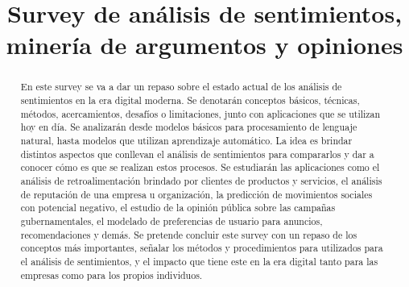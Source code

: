 \documentclass[conference]{IEEEtran}
\begin{document}
\title{Survey de análisis de sentimientos, minería de argumentos y opiniones\\
}

\author{
\and
{}
\and
{}
}

\maketitle

\begin{abstract}
  En este survey se va a dar un repaso sobre el estado actual de los análisis de sentimientos en la era digital moderna. 
  Se denotarán conceptos básicos, técnicas, métodos, acercamientos, desafíos o limitaciones, junto con aplicaciones que se utilizan hoy en día. 
  Se analizarán desde modelos básicos para procesamiento de lenguaje natural, hasta modelos que utilizan aprendizaje automático. 
  La idea es brindar distintos aspectos que conllevan el análisis de sentimientos para compararlos y dar a conocer cómo es que se realizan estos procesos. 
  Se estudiarán las aplicaciones como el análisis de retroalimentación brindado por clientes de productos y servicios, el análisis de reputación de una empresa u organización, la predicción de movimientos sociales con potencial negativo, el estudio de la opinión pública sobre las campañas gubernamentales, el modelado de preferencias de usuario para anuncios, recomendaciones y demás. 
  Se pretende concluir este survey con un repaso de los conceptos más importantes, señalar los métodos y procedimientos para utilizados para el análisis de sentimientos, y el impacto que tiene este en la era digital tanto para las empresas como para los propios individuos.
\end{abstract}
\end{document}
